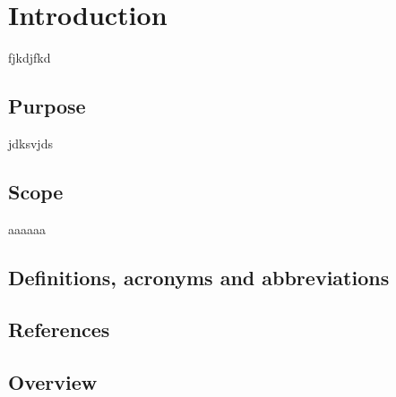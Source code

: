 \section{Introduction}
	fjkdjfkd
	\subsection{Purpose}
	jdksvjds
	\subsection{Scope}
	aaaaaa
	\subsection{Definitions, acronyms and abbreviations}
	\subsection{References}
	\subsection{Overview}